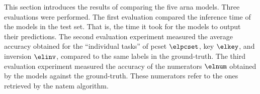 
This section introduces the results of comparing the five
\gls{arna} models. Three evaluations were performed. The
first evaluation compared the inference time of the models
in the test set. That is, the time it took for the models to
output their predictions. The second evaluation experiment
measured the average accuracy obtained for the ``individual
tasks'' of \gls{pcset} $\elpcset$, key $\elkey$, and
inversion $\elinv$, compared to the same labels in the
ground-truth. The third evaluation experiment measured the
accuracy of the numerators $\elnum$ obtained by the models
against the ground-truth. These numerators refer to the ones
retrieved by the \gls{natem} algorithm.

